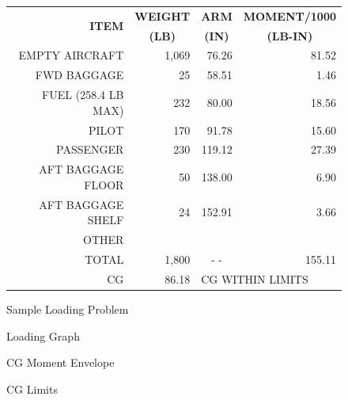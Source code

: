 \begin{figure}

\begin{center}
  \settowidth{\colOne}{AFT BAGGAGE FLOOR}
  \begin{tabular}{|r|r|r|r|}
    \hline
    \multirow{2}{\colOne}{\centering\bfseries{ITEM}}&\multicolumn{1}{|c|}{\bfseries{WEIGHT}}&\multicolumn{1}{c|}{\bfseries{ARM}}& \multicolumn{1}{c|}{\bfseries{MOMENT/1000}}\\
    &\multicolumn{1}{|c|}{\bfseries{(LB)}}&\multicolumn{1}{c|}{\bfseries{(IN)}}& \multicolumn{1}{c|}{\bfseries{(LB-IN)}}\\
    \hline\hline
    EMPTY AIRCRAFT&1,069&76.26&81.52\\
    \hline
    FWD BAGGAGE&25&58.51&1.46\\
    \hline
    FUEL (258.4 LB MAX)&232&80.00&18.56\\
    \hline
    PILOT&170&91.78&15.60\\
    \hline
    PASSENGER&230&119.12&27.39\\
    \hline
    AFT BAGGAGE FLOOR&50&138.00&6.90\\
    \hline
    AFT BAGGAGE SHELF&24&152.91&3.66\\
    \hline
    OTHER&&&\\
    \hline \hline
   TOTAL&1,800&\multicolumn{1}{c|}{- -}&155.11\\
    \hline
    \multicolumn{1}{r|}{CG}&86.18&\multicolumn{2}{l}{CG WITHIN LIMITS}\\
    \cline{2-2}
    \end{tabular}

  \caption{Sample Loading Problem}
  \label{Sample-Loading-Problem}
  \end{center}
  \end{figure}

\begin{figure}

\begin{center}
  
  \end{center}

\caption{Loading Graph}
\label{Loading-Graph}
\end{figure}

\begin{figure}
\begin{center}
  \end{center}

\caption{CG Moment Envelope}
\label{CG-Moment}
\end{figure}

\begin{figure}
\begin{center}
  \end{center}
\caption{CG Limits}
\label{CG-chart}
\end{figure}

\cleardoublepage
